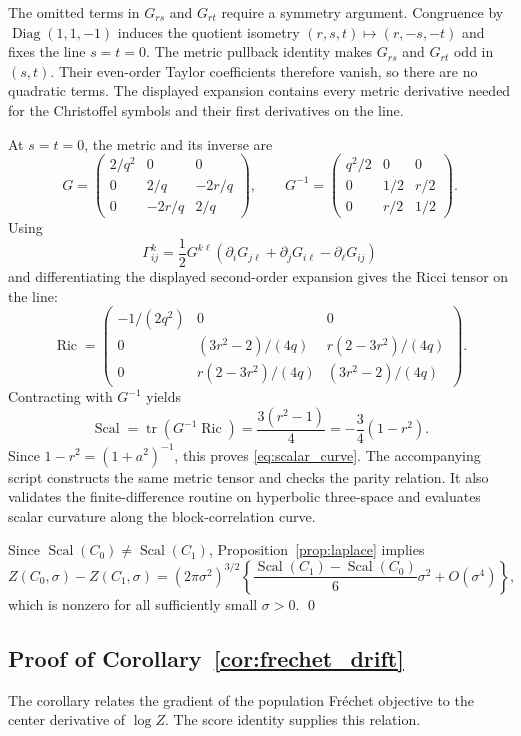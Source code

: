 \documentclass[
  12pt]{article}
\newcommand{\tr}{\operatorname{tr}}
\newcommand{\Scal}{\operatorname{Scal}}
\newcommand{\Ric}{\operatorname{Ric}}
\begin{document}
The omitted terms in $G_{rs}$ and $G_{rt}$ require a symmetry argument. Congruence by $\operatorname{Diag}(1,1,-1)$ induces the quotient isometry $(r,s,t)\mapsto(r,-s,-t)$ and fixes the line $s=t=0$. The metric pullback identity makes $G_{rs}$ and $G_{rt}$ odd in $(s,t)$. Their even-order Taylor coefficients therefore vanish, so there are no quadratic terms. The displayed expansion contains every metric derivative needed for the Christoffel symbols and their first derivatives on the line.

At $s=t=0$, the metric and its inverse are
\[
G=\begin{pmatrix}
2/q^2&0&0\\
0&2/q&-2r/q\\
0&-2r/q&2/q
\end{pmatrix},\qquad
G^{-1}=\begin{pmatrix}
q^2/2&0&0\\
0&1/2&r/2\\
0&r/2&1/2
\end{pmatrix}.
\]
Using
\[
\Gamma^k_{ij}=\frac12G^{k\ell}(\partial_iG_{j\ell}+\partial_jG_{i\ell}-\partial_\ell G_{ij})
\]
and differentiating the displayed second-order expansion gives the Ricci tensor on the line:
\[
\Ric=\begin{pmatrix}
-1/(2q^2)&0&0\\[2mm]
0&(3r^2-2)/(4q)&r(2-3r^2)/(4q)\\[2mm]
0&r(2-3r^2)/(4q)&(3r^2-2)/(4q)
\end{pmatrix}.
\]
Contracting with $G^{-1}$ yields
\[
\Scal=\tr(G^{-1}\Ric)=\frac{3(r^2-1)}4=-\frac34(1-r^2).
\]
Since $1-r^2=(1+a^2)^{-1}$, this proves \eqref{eq:scalar_curve}. The accompanying script  constructs the same metric tensor and checks the parity relation. It also validates the finite-difference routine on hyperbolic three-space and evaluates scalar curvature along the block-correlation curve.

Since $\Scal(C_0)\ne\Scal(C_1)$, Proposition~\ref{prop:laplace} implies
\[
Z(C_0,\sigma)-Z(C_1,\sigma)=(2\pi\sigma^2)^{3/2}\left\{\frac{\Scal(C_1)-\Scal(C_0)}{6}\sigma^2+O(\sigma^4)\right\},
\]
which is nonzero for all sufficiently small $\sigma>0$. \qed


\subsection{Proof of Corollary~\ref{cor:frechet_drift}}

The corollary relates the gradient of the population Fr\'echet objective to the center derivative of $\log Z$. The score identity supplies this relation.
\end{document}
